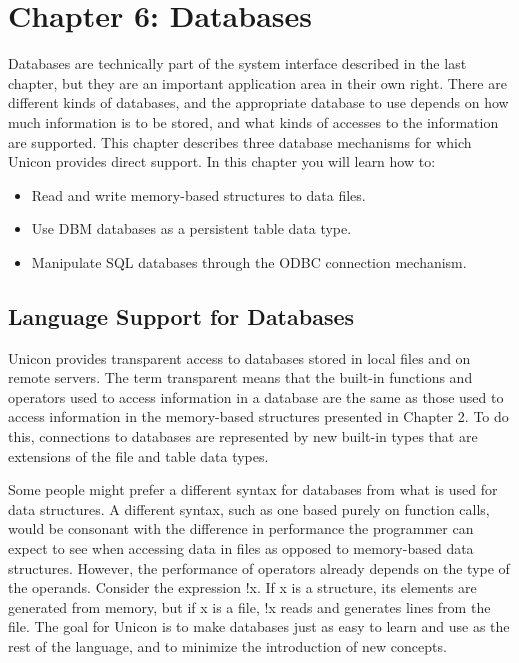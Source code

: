\clearpage\section{Chapter 6: Databases}

Databases are technically part of the system interface
described in the last chapter, but they are an important application
area in their own right. There are different kinds of databases, and
the appropriate database to use depends on how much information is to
be stored, and what kinds of accesses to the information are supported.
This chapter describes three database mechanisms for which Unicon
provides direct support. In this chapter you will learn how to:

\begin{itemize}
\item Read and write memory-based structures to data files.
\item Use DBM databases as a persistent table data type.
\item Manipulate SQL databases through the ODBC connection mechanism.
\end{itemize}

\subsection{Language Support for Databases}

Unicon provides transparent access to databases stored in local files
and on remote servers. The term
{\textquotedbl}transparent{\textquotedbl} means that the built-in
functions and operators used to access information in a database are
the same as those used to access information in the memory-based
structures presented in Chapter 2. To do this, connections to databases
are represented by new built-in types that are extensions of the file
and table data types.

Some people might prefer a different syntax for databases from what is
used for data structures. A different syntax, such as one based purely
on function calls, would be consonant with the difference in
performance the programmer can expect to see when accessing data in
files as opposed to memory-based data structures. However, the
performance of operators already depends on the type of the operands.
Consider the expression \textsf{!x}. If \textsf{x} is a structure, its
elements are generated from memory, but if \textsf{x} is a file,
\textsf{!x} reads and generates lines from the file. The goal for
Unicon is to make databases just as easy to learn and use as the rest
of the language, and to minimize the introduction of new concepts.


